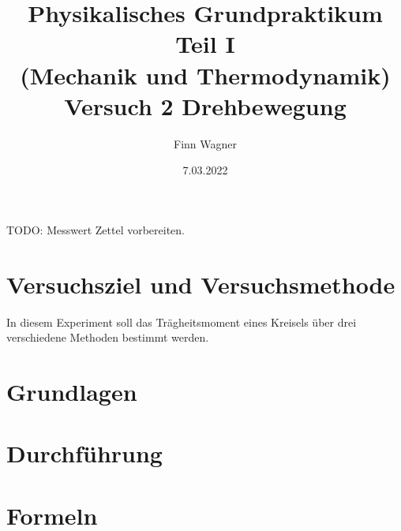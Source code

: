 \documentclass{article}
\date{7.03.2022}
\title{Physikalisches Grundpraktikum Teil I \\ (Mechanik und Thermodynamik) \\ Versuch 2 Drehbewegung}
\author{Finn Wagner}
\begin{document}
    \maketitle

    TODO: Messwert Zettel vorbereiten.
    \section{Versuchsziel und Versuchsmethode}
      In diesem Experiment soll das Trägheitsmoment eines Kreisels über drei verschiedene Methoden bestimmt werden.
      

    \section{Grundlagen}

    \section{Durchführung}

    \section{Formeln}
\end{document}
